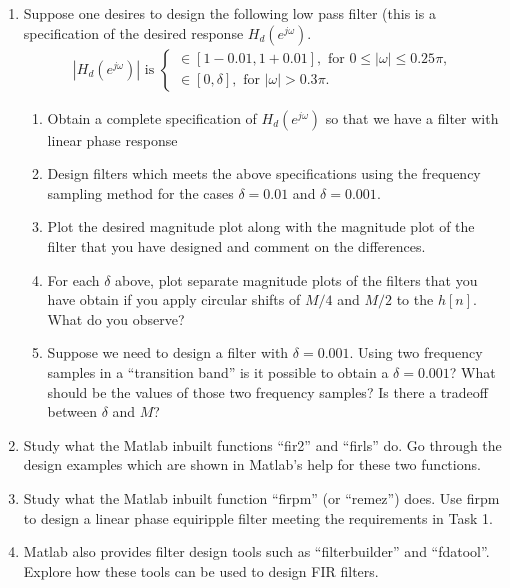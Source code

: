 \begin{enumerate}
\item Suppose one desires to design the following low pass filter (this is a specification of the desired response $H_{d}(e^{j\omega})$.
  \begin{eqnarray*}
    |H_{d}(e^{j\omega})| \text{ is }
    \begin{cases}
      \in [1 - 0.01, 1 + 0.01], \text{ for } 0 \leq |\omega| \leq 0.25 \pi, \\
      \in [0, \delta], \text{ for } |\omega| > 0.3\pi.
    \end{cases}
  \end{eqnarray*}
  \begin{enumerate}
  \item Obtain a complete specification of $H_{d}(e^{j\omega})$ so that we have a filter with linear phase response
  \item Design filters which meets the above specifications using the frequency sampling method for the cases $\delta = 0.01$ and $\delta = 0.001$.
  \item Plot the desired magnitude plot along with the magnitude plot of the filter that you have designed and comment on the differences.
  \item For each $\delta$ above, plot separate magnitude plots of the filters that you have obtain if you apply circular shifts of $M/4$ and $M/2$ to the $h[n]$. What do you observe?
  \item Suppose we need to design a filter with $\delta = 0.001$. Using two frequency samples in a ``transition band'' is it possible to obtain a $\delta = 0.001$? What should be the values of those two frequency samples? Is there a tradeoff between $\delta$ and $M$?
  \end{enumerate}
\item Study what the Matlab inbuilt functions ``fir2'' and ``firls'' do. Go through the design examples which are shown in Matlab's help for these two functions.
\item Study what the Matlab inbuilt function  ``firpm'' (or ``remez'') does. Use firpm to design a linear phase equiripple filter meeting the requirements in Task 1.
\item Matlab also provides filter design tools such as ``filterbuilder'' and ``fdatool''. Explore how these tools can be used to design FIR filters.


\end{enumerate}
